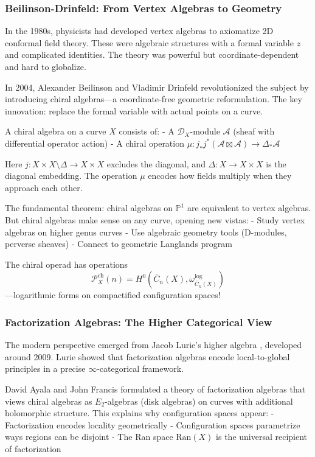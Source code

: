\subsubsection{Beilinson-Drinfeld: From Vertex Algebras to Geometry}

In the 1980s, physicists had developed vertex algebras to axiomatize 2D conformal field theory. These were algebraic structures with a formal variable $z$ and complicated identities. The theory was powerful but coordinate-dependent and hard to globalize.

In 2004, Alexander Beilinson and Vladimir Drinfeld \cite{BD04} revolutionized the subject by introducing chiral algebras—a coordinate-free geometric reformulation. The key innovation: replace the formal variable with actual points on a curve.

A chiral algebra on a curve $X$ consists of:
- A $\mathcal{D}_X$-module $\mathcal{A}$ (sheaf with differential operator action)
- A chiral operation $\mu: j_*j^*(\mathcal{A} \boxtimes \mathcal{A}) \to \Delta_*\mathcal{A}$

Here $j: X \times X \setminus \Delta \to X \times X$ excludes the diagonal, and $\Delta: X \to X \times X$ is the diagonal embedding. The operation $\mu$ encodes how fields multiply when they approach each other.

The fundamental theorem: chiral algebras on $\mathbb{P}^1$ are equivalent to vertex algebras. But chiral algebras make sense on any curve, opening new vistas:
- Study vertex algebras on higher genus curves
- Use algebraic geometry tools (D-modules, perverse sheaves)
- Connect to geometric Langlands program

The chiral operad has operations
$$\mathcal{P}^{\text{ch}}_X(n) = H^0(\overline{C}_n(X), \omega_{\overline{C}_n(X)}^{\text{log}})$$
—logarithmic forms on compactified configuration spaces!

\subsubsection{Factorization Algebras: The Higher Categorical View}

The modern perspective emerged from Jacob Lurie's higher algebra \cite{HA}, developed around 2009. Lurie showed that factorization algebras encode local-to-global principles in a precise $\infty$-categorical framework.

David Ayala and John Francis \cite{AF15} formulated a theory of factorization algebras that views chiral algebras as $E_2$-algebras (disk algebras) on curves with additional holomorphic structure. This explains why configuration spaces appear:
- Factorization encodes locality geometrically
- Configuration spaces parametrize ways regions can be disjoint
- The Ran space $\text{Ran}(X)$ is the universal recipient of factorization

